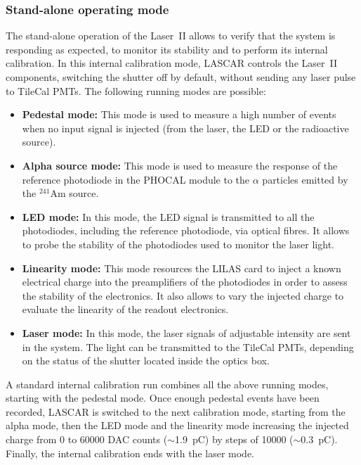 \subsubsection*{Stand-alone operating mode}

The stand-alone operation of the Laser~II allows to verify that the system is responding as expected, to monitor its stability and to perform its internal calibration. In this internal calibration mode, LASCAR controls the Laser~II components, switching the shutter off by default, without sending any laser pulse to TileCal PMTs. The following running modes are possible:

\begin{itemize}
\item \textbf{Pedestal mode:} This mode is used to measure a high number of events when no input signal is injected (from the laser, the LED or the radioactive source).
\item \textbf{Alpha source mode:} This mode is used to measure the response of the reference photodiode in the PHOCAL module to the $\alpha$ particles emitted by the $^{241}$Am source.
\item \textbf{LED mode:} In this mode, the LED signal is transmitted to all the photodiodes, including the reference photodiode, via optical fibres. It allows to probe the stability of the photodiodes used to monitor the laser light.
\item \textbf{Linearity mode:} This mode resources the LILAS card to inject a known electrical charge into the preamplifiers of the photodiodes in order to assess the stability of the electronics. It also allows to vary the injected charge to evaluate the linearity of the readout electronics.
\item \textbf{Laser mode:} In this mode, the laser signals of adjustable intensity are sent in the system. The light can be transmitted to the TileCal PMTs, depending on the status of the shutter located inside the optics box. %
\end{itemize}

A standard internal calibration run combines all the above running modes, starting with the pedestal mode. Once enough pedestal events have been recorded, LASCAR is switched to the next calibration mode, starting from the alpha mode, then the LED mode and the linearity mode increasing the injected charge from 0 to 60000 DAC counts ($\sim$1.9~pC) by steps of 10000 ($\sim$0.3~pC). Finally, the internal calibration ends with the laser mode.

